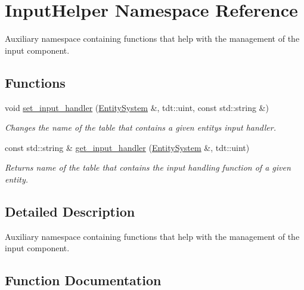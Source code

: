 \hypertarget{namespace_input_helper}{}\section{Input\+Helper Namespace Reference}
\label{namespace_input_helper}


Auxiliary namespace containing functions that help with the management of the input component.  


\subsection*{Functions}
\begin{DoxyCompactItemize}
\item 
void \hyperlink{namespace_input_helper_a40ecb052b5c634dc43a808dce472b035}{set\+\_\+input\+\_\+handler} (\hyperlink{class_entity_system}{Entity\+System} \&, tdt\+::uint, const std\+::string \&)
\begin{DoxyCompactList}\small\item\em Changes the name of the table that contains a given entity\textquotesingle{}s input handler. \end{DoxyCompactList}\item 
const std\+::string \& \hyperlink{namespace_input_helper_a6b3ed7f48f565e816177685e0b35df0e}{get\+\_\+input\+\_\+handler} (\hyperlink{class_entity_system}{Entity\+System} \&, tdt\+::uint)
\begin{DoxyCompactList}\small\item\em Returns name of the table that contains the input handling function of a given entity. \end{DoxyCompactList}\end{DoxyCompactItemize}


\subsection{Detailed Description}
Auxiliary namespace containing functions that help with the management of the input component. 

\subsection{Function Documentation}
